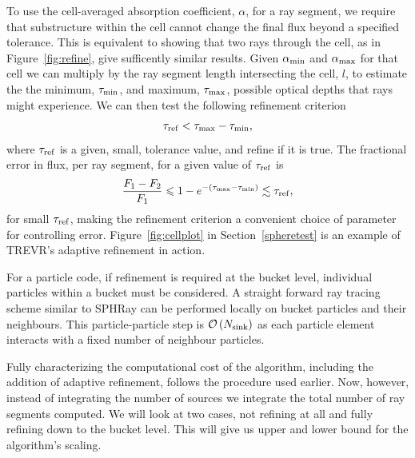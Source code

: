 \documentclass[fleq,usenatbib]{mnras}
\newcommand{\acro}{TREVR}
\newcommand{\bigO}[1]{\mathcal{O}\left(#1\right)}
\newcommand{\NK}{N_{\rm sink}}
\newcommand{\tr}{\tau_{\rm ref}}
\begin{document}
{To use the cell-averaged absorption coefficient, $\alpha$, for a ray segment,
we require that substructure within the cell cannot change the final flux
beyond a specified tolerance.
This is equivalent to showing that two rays through the cell,
as in Figure~\ref{fig:refine}, give sufficently similar results.
Given $\alpha_{\rm min}$ and $\alpha_{\rm max}$ for that cell we can multiply
by the ray segment length intersecting the cell, 
$l$, to estimate the the minimum, $\tau_{\rm min}$, and maximum, $\tau_{\rm max}$,
possible optical depths that rays might experience.
We can then test the following refinement criterion
\begin{equation}
\label{eqn:refcrit}
\tr < \tau_{\rm max} - \tau_{\rm min},
\end{equation}
where $\tr$ is a given, small, tolerance value, and refine if it is true. The 
fractional error in flux, per ray segment, for a given value of $\tr$ is
\begin{equation}
\label{eqn:reffrac}
\frac{F_1 - F_2}{F_1} \leq 1 - e^{-(\tau_{\rm max}-\tau_{\rm min})} 
\lesssim \tr,
\end{equation}
for small $\tr$, making the refinement criterion a convenient choice of 
parameter for controlling error. Figure~\ref{fig:cellplot} in Section~\ref{spheretest}
is an example of 
\acro{}'s adaptive refinement in action.

For a particle code, if refinement is required at the bucket level, individual particles 
within a bucket must be considered.  A straight forward ray tracing scheme 
similar to SPHRay \citep{altayEt08} can be performed locally on bucket particles and 
their neighbours.   This particle-particle step is $\bigO{\NK}$ as each particle element
interacts with a fixed number of neighbour particles.

Fully characterizing the computational cost of the algorithm, including the 
addition of adaptive refinement, follows the procedure used earlier. 
Now, however, instead of integrating the number of sources we integrate the 
total number of ray segments computed. We will look at two cases, not refining 
at all and fully refining down to the bucket level. This will give us upper 
and lower bound for the algorithm's scaling.

}
\end{document}
